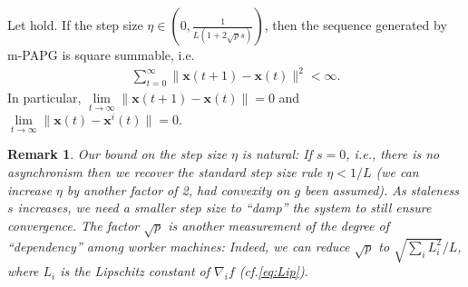 \documentclass[leqno,onefignum,onetabnum]{siamart0516}
\newtheorem{remark}{Remark}
\newcommand{\ie}{{i.e.}\xspace}
\newcommand{\cf}{{cf.}\xspace}
\newcommand{\xb}{\mathbf{x}}
\newcommand{\mspg}{\textsf{m-PAPG}\xspace}
\begin{document}
\begin{theorem}\label{thm:limitcon}
Let  hold. If the step  size $\eta \in \left(0, \frac{1}{L(1+2\sqrt{p}s)}\right)$, then the sequence generated by \mspg is square summable, \ie
\begin{align}\label{sq_summable} 
\sum_{t=0}^{\infty} \|\xb(t+1) - \xb(t)\|^2 < \infty.
\end{align}
In particular, $\lim\limits_{t\to\infty} \|\xb(t+1) - \xb(t)\| = 0$ and  $\lim\limits_{t\to\infty} \|\xb(t) - \xb^i(t)\| = 0$.
\end{theorem}
\begin{remark}
Our bound on the step size $\eta$ is natural: If $s = 0$, \ie, there is no asynchronism then we recover the standard step size rule $\eta < 1/L$ (we can increase $\eta$ by another factor of 2, had convexity on $g$ been assumed). As staleness $s$ increases, we need a smaller step size to ``damp'' the system to still ensure convergence. The factor $\sqrt{p}$ is another measurement of the degree of ``dependency'' among worker machines: Indeed, we can reduce $\sqrt{p}$ to $\sqrt{\sum_i L_i^2} / L$, where $L_i$ is the Lipschitz constant of $\nabla_i f$ (\cf \eqref{eq:Lip}). %
\end{remark}
\end{document}
